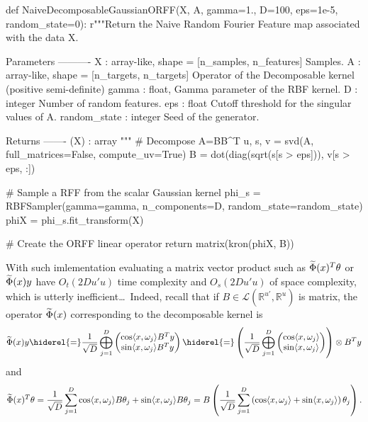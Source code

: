 \begin{pyblock}
def NaiveDecomposableGaussianORFF(X, A, gamma=1.,
                                  D=100, eps=1e-5, random_state=0):
    r"""Return the Naive Random Fourier Feature map associated with the data X.

    Parameters
    ----------
    X : {array-like}, shape = [n_samples, n_features]
        Samples.
    A : {array-like}, shape = [n_targets, n_targets]
        Operator of the Decomposable kernel (positive semi-definite)
    gamma : {float},
        Gamma parameter of the RBF kernel.
    D : {integer}
        Number of random features.
    eps : {float}
        Cutoff threshold for the singular values of A.
    random_state : {integer}
        Seed of the generator.

    Returns
    -------
    \tilde{\Phi}(X) : array
    """
    # Decompose A=BB^T
    u, s, v = svd(A, full_matrices=False, compute_uv=True)
    B = dot(diag(sqrt(s[s > eps])), v[s > eps, :])

    # Sample a RFF from the scalar Gaussian kernel
    phi_s = RBFSampler(gamma=gamma, n_components=D, random_state=random_state)
    phiX = phi_s.fit_transform(X)

    # Create the ORFF linear operator
    return matrix(kron(phiX, B))
\end{pyblock}
With such imlementation evaluating a matrix vector product such as $\widetilde{\Phi}(x)^T\theta$ or $\widetilde{\Phi}(x)y$ have $O_t(2Du'u)$ time complexity and $O_s(2Du'u)$ of space complexity, which is utterly inefficient\ldots~Indeed, recall that if $B\in\mathcal{L}\left(\mathbb{R}^{u'}, \mathbb{R}^u\right)$ is matrix, the operator $\widetilde{\Phi}(x)$ corresponding to the decomposable kernel is
\begin{dmath*}
\tildePhi{\omega}(x)y \hiderel{=} \frac{1}{\sqrt{D}}\Vect_{j=1}^D\begin{pmatrix}\cos\inner{x, \omega_j} B^Ty \\ \sin\inner{x, \omega_j} B^Ty \end{pmatrix} \hiderel{=} \left(\frac{1}{\sqrt{D}}\Vect_{j=1}^D\begin{pmatrix}\cos\inner{x, \omega_j} \\ \sin\inner{x, \omega_j} \end{pmatrix}\right)\otimes B^Ty
\end{dmath*}
and
\begin{dmath*}
\tildePhi{\omega}(x)^T\theta = \frac{1}{\sqrt{D}} \sum_{j=1}^D \cos\inner{x, \omega_j}B\theta_j + \sin\inner{x, \omega_j}B\theta_j = B\left(\frac{1}{\sqrt{D}} \sum_{j=1}^D \left(\cos\inner{x, \omega_j} + \sin\inner{x, \omega_j}\right)\theta_j\right).
\end{dmath*}
